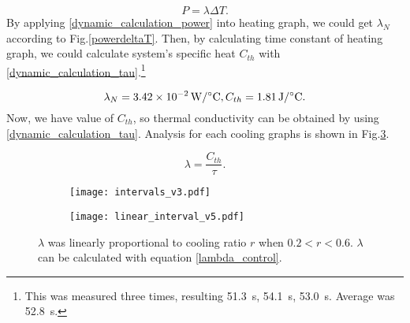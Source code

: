 \begin{equation} \label{dynamic_calculation_power}
P = \lambda\Delta{T}.
\end{equation}
By applying \eqref{dynamic_calculation_power} into heating graph, we could get $\lambda_{N}$ according to Fig.\ref{powerdeltaT}. Then, by calculating time constant of heating graph, we could calculate \scp system's specific heat $C_{th}$ with \eqref{dynamic_calculation_tau}.\footnote{This was measured three times, resulting \SI{51.3}{\second}, \SI{54.1}{\second}, \SI{53.0}{\second}. Average was \SI{52.8}{\second}.} 

\begin{equation}
\lambda_{N}=\SI{3.42e-2}{\watt\per\degreeCelsius}, C_{th}=\SI{1.81}{\joule\per\degreeCelsius}. \notag
\end{equation}
Now, we have value of $C_{th}$, so thermal conductivity can be obtained by using \eqref{dynamic_calculation_tau}. Analysis for each cooling graphs is shown in Fig.\ref{analysis_dynamic}.

\begin{equation} \label{dynamic_calculation_tau}
\lambda = \frac{C_{th}}{\tau}.
\end{equation}

\begin{figure}[t]
	\begin{subfigure}[t]{0.52\linewidth}
		\centering\texttt{[image: intervals\_v3.pdf]}
		\caption{\label{dynamic_proportional}}
	\end{subfigure}%
	\begin{subfigure}[t]{0.39\linewidth}
		\centering\texttt{[image: linear\_interval\_v5.pdf]}
		\caption{\label{linear_interval}}
	\end{subfigure}
	\caption[Analysis of dynamic experiment]{ $\lambda$ was linearly proportional to cooling ratio $r$ when $0.2<r<0.6$.   $\lambda$ can be calculated with equation \eqref{lambda_control}.}
	\label{analysis_dynamic}
\end{figure}

